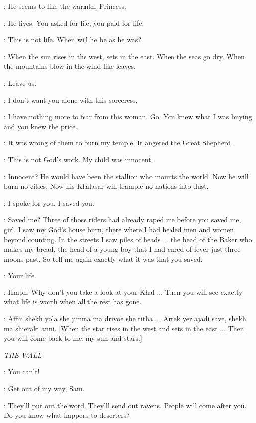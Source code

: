 \JORAH: He seems to like the warmth, Princess. 

\MIRRI: He lives. You asked for life, you paid for life. 

\DAENERYS: This is not life. When will he be as he was? 

\MIRRI: When the sun rises in the west, sets in the east.  When the seas go dry. When the mountains blow in the wind like leaves. 

\DAENERYS:  Leave us. 

\JORAH: I don't want you alone with this sorceress. 

\DAENERYS: I have nothing more to fear from this woman. Go. You knew what I was buying and you knew the price. 

\MIRRI: It was wrong of them to burn my temple. It angered the Great Shepherd. 

\DAENERYS: This is not God's work. My child was innocent. 

\MIRRI: Innocent? He would have been the stallion who mounts the world. Now he will burn no cities. Now his Khalasar will trample no nations into dust. 

\DAENERYS: I spoke for you. I saved you. 

\MIRRI: Saved me? Three of those riders had already raped me before you saved me, girl. I saw my God's house burn, there where I had healed men and women beyond counting. In the streets I saw piles of heads $\ldots$ the head of the Baker who makes my bread, the head of a young boy that I had cured of fever just three moons past. So tell me again exactly what it was that you saved. 

\DAENERYS: Your life. 

\MIRRI: Hmph. Why don't you take a look at your Khal $\ldots$ Then you will see exactly what life is worth when all the rest has gone. 

\DAENERYS: Affin shekh yola she jimma ma drivoe she titha $\ldots$ Arrek yer ajadi save, shekh ma shieraki anni. [When the star rises in the west and sets in the east $\ldots$ Then you will come back to me, my sun and stars.]


\scene

\textit{THE WALL}


\SAM: You can't! 

\JON: Get out of my way, Sam. 

\SAM: They'll put out the word. They'll send out ravens. People will come after you. Do you know what happens to deserters? 

